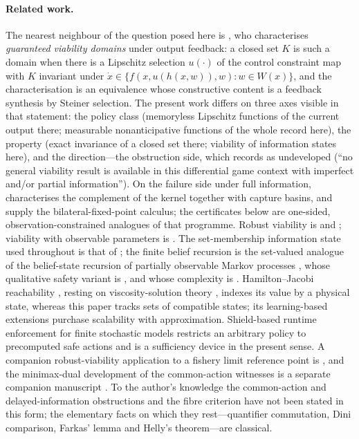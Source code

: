 \documentclass[11pt,a4paper]{article}
\theoremstyle{plain}
\theoremstyle{definition}
\theoremstyle{remark}
\begin{document}
\paragraph{Related work.} The nearest neighbour of the question posed here is \citet{doyen2000}, who characterises \emph{guaranteed viability domains} under output feedback: a closed set $K$ is such a domain when there is a Lipschitz selection $u(\cdot)$ of the control constraint map with $K$ invariant under $\dot x\in\{f(x,u(h(x,w)),w):w\in W(x)\}$, and the characterisation is an equivalence whose constructive content is a feedback synthesis by Steiner selection. The present work differs on three axes visible in that statement: the policy class (memoryless Lipschitz functions of the current output there; measurable nonanticipative functions of the whole record here), the property (exact invariance of a closed set there; viability of information states here), and the direction---the obstruction side, which \citet{doyen2000} records as undeveloped (``no general viability result is available in this differential game context with imperfect and/or partial information''). On the failure side under full information, \citet{aubin2001} characterises the complement of the kernel together with capture basins, and \citet{aubin2002} supply the bilateral-fixed-point calculus; the certificates below are one-sided, observation-constrained analogues of that programme. Robust viability is \citet{aubinfrankowska1990} and \citet{frankowska1989}; viability with observable parameters is \citet{quincampoix1994}. The set-membership information state used throughout is that of \citet{kurzhanski1997}; the finite belief recursion is the set-valued analogue of the belief-state recursion of partially observable Markov processes \citep{astrom1965,smallwood1973}, whose qualitative safety variant is \citet{chatterjee2009}, and whose complexity is \citet{papadimitriou1987}. Hamilton--Jacobi reachability \citep{mitchell2005,margellos2011,bansal2017}, resting on viscosity-solution theory \citep{crandall1992}, indexes its value by a physical state, whereas this paper tracks sets of compatible states; its learning-based extensions \citep{bansal2021} purchase scalability with approximation. Shield-based runtime enforcement for finite stochastic models \citep{alshiekh2018} restricts an arbitrary policy to precomputed safe actions and is a sufficiency device in the present sense. A companion robust-viability application to a fishery limit reference point is \citet{abaee2026fish}, and the minimax-dual development of the common-action witnesses is a separate companion manuscript \citep{abaee2026minimax}. To the author's knowledge the common-action and delayed-information obstructions and the fibre criterion have not been stated in this form; the elementary facts on which they rest---quantifier commutation, Dini comparison, Farkas' lemma and Helly's theorem---are classical.
\end{document}
